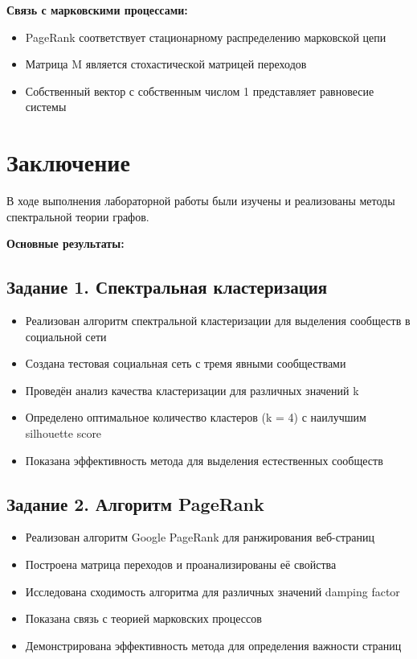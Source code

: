 \textbf{Связь с марковскими процессами:}
\begin{itemize}
    \item PageRank соответствует стационарному распределению марковской цепи
    \item Матрица M является стохастической матрицей переходов
    \item Собственный вектор с собственным числом 1 представляет равновесие системы
\end{itemize}

\section*{Заключение}

В ходе выполнения лабораторной работы были изучены и реализованы методы спектральной теории графов.

\textbf{Основные результаты:}

\subsection*{Задание 1. Спектральная кластеризация}

\begin{itemize}
    \item Реализован алгоритм спектральной кластеризации для выделения сообществ в социальной сети
    \item Создана тестовая социальная сеть с тремя явными сообществами
    \item Проведён анализ качества кластеризации для различных значений k
    \item Определено оптимальное количество кластеров (k = 4) с наилучшим silhouette score
    \item Показана эффективность метода для выделения естественных сообществ
\end{itemize}

\subsection*{Задание 2. Алгоритм PageRank}

\begin{itemize}
    \item Реализован алгоритм Google PageRank для ранжирования веб-страниц
    \item Построена матрица переходов и проанализированы её свойства
    \item Исследована сходимость алгоритма для различных значений damping factor
    \item Показана связь с теорией марковских процессов
    \item Демонстрирована эффективность метода для определения важности страниц
\end{itemize}

